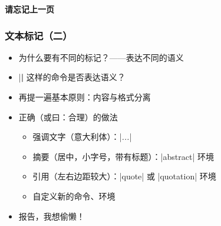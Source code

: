 \begin{frame}[standout]
  \huge \textbf{请忘记上一页}
\end{frame}

\begin{frame}[fragile]
\frametitle{文本标记（二）}
\begin{itemize}
  \item 为什么要有不同的标记？\pause\mbox{}——表达不同的\alert{语义} \pause
  \item |\textbf| 这样的命令是否表达语义？ \pause
  \item 再提一遍基本原则：\alert{内容与格式分离} \pause
  \item 正确（或曰：合理）的做法

    \begin{itemize}
      \item 强调文字（意大利体）：|\emph{...}|
      \item 摘要（居中，小字号，带有标题）：|abstract| 环境
      \item 引用（左右边距较大）：|quote| 或 |quotation| 环境
      \item 自定义新的命令、环境
    \end{itemize} \pause

  \item 报告，我想偷懒！
\end{itemize}
\end{frame}

